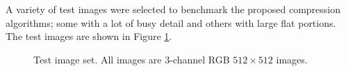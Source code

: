 \documentclass[conference]{IEEEtran}
\begin{document}
A variety of test images were selected to benchmark the proposed compression algorithms; some with a lot of busy detail and others with large flat portions.
The test images are shown in Figure \ref{fig:testimages}.
\begin{figure}
    \centering
    \quad
    \quad
    \par
    \quad
    \caption{Test image set. All images are 3-channel RGB $512\times512$ images.}
    \label{fig:testimages}
\end{figure}
\end{document}
